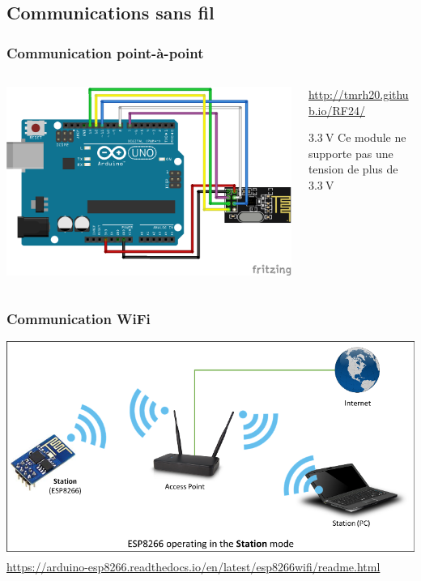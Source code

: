\documentclass[aspectratio=169,utf8,french]{beamer}
\begin{document}
\begin{frame}
  \tableofcontents[currentsection]
\end{frame}

\subsection{Communications sans fil}

\begin{frame}
  \frametitle{Communication point-à-point}
  \begin{columns}
    \begin{column}{0.6\textwidth}
      \includegraphics[width=\textwidth]{pictures/UNO-nRF24L01_bb.png}
    \end{column}
    \begin{column}{0.4\textwidth}
      {\small \url{http://tmrh20.github.io/RF24/}}
      \begin{alertblock}{$\SI{3.3}{\volt}$}
        Ce module ne supporte pas une tension de plus de $\SI{3.3}{\volt}$
      \end{alertblock}
    \end{column}
  \end{columns}
\end{frame}

\begin{frame}
  \frametitle{Communication WiFi}
  \begin{center}
    \includegraphics[height=.7\textheight]{pictures/esp8266-station.png}
    \footnotesize\url{https://arduino-esp8266.readthedocs.io/en/latest/esp8266wifi/readme.html}
  \end{center}
\end{frame}
\end{document}
